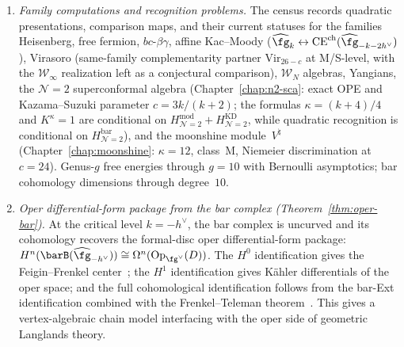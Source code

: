 \begin{enumerate}[label=\emph{(\arabic*)}]
\item \emph{Family computations and recognition problems.}
 The census records quadratic presentations, comparison maps, and
their current statuses for the families
 Heisenberg, free fermion, $bc$-$\beta\gamma$, affine Kac--Moody
 ($\widehat{\fg}_k \leftrightarrow \mathrm{CE}^{\mathrm{ch}}(\widehat{\fg}_{-k-2h^\vee})$),
 Virasoro
 \textup{(}same-family complementarity partner
 $\mathrm{Vir}_{26-c}$ at M/S-level, with the
 $\mathcal{W}_\infty$ realization left as a conjectural comparison\textup{)},
 $\mathcal{W}_N$ algebras, Yangians,
 the $\mathcal{N}=2$ superconformal algebra
 \textup{(}Chapter~\ref{chap:n2-sca}:
 exact OPE and Kazama--Suzuki parameter $c=3k/(k+2)$;
 the formulas $\kappa=(k+4)/4$ and
 $K^\kappa=1$ are conditional on
 $H_{\mathcal N=2}^{\mathrm{mod}}+H_{\mathcal N=2}^{\mathrm{KD}}$,
 while quadratic recognition is conditional on
 $H_{\mathcal N=2}^{\mathrm{bar}}$\textup{)},
 and the moonshine module~$V^\natural$
 \textup{(}Chapter~\ref{chap:moonshine}:
 $\kappa = 12$, class~M, Niemeier discrimination
 at $c = 24$\textup{)}.
 Genus-$g$ free energies through $g = 10$ with
 Bernoulli asymptotics; bar cohomology dimensions through
 degree~$10$.

\item \emph{Oper differential-form package from the bar complex
 (Theorem~\ref{thm:oper-bar}).}
 At the critical level $k = -h^\vee$, the bar complex is uncurved
 and its cohomology recovers the formal-disc oper
 differential-form package:
 $H^n(\barB(\widehat{\fg}_{-h^\vee}))
 \cong \Omega^n(\mathrm{Op}_{\fg^\vee}(D))$.
 The $H^0$ identification gives the Feigin--Frenkel
 center~\cite{Feigin-Frenkel}; the $H^1$ identification
 gives K\"ahler differentials of the oper space; and the
 full cohomological identification follows from the bar-Ext
 identification combined with the
 Frenkel--Teleman theorem~\cite{FT06}.
 This gives a vertex-algebraic chain model interfacing with the
 oper side of geometric Langlands theory.


\end{enumerate}

